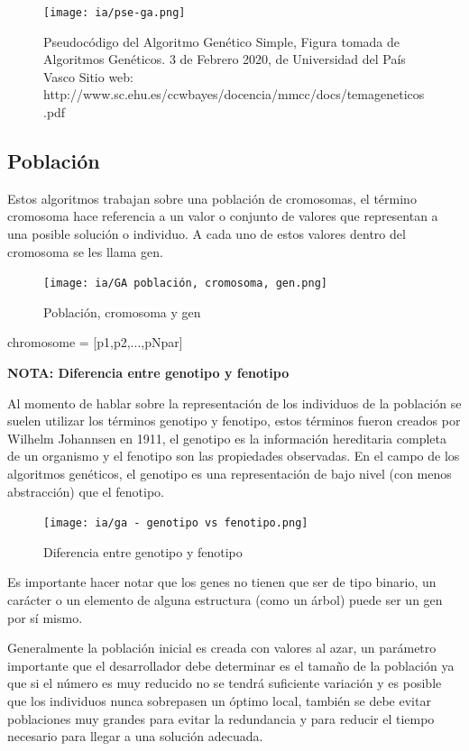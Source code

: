 \documentclass[11pt,fleqn]{book} %
\begin{document}
\begin{figure}[ht]
\centering\texttt{[image: ia/pse-ga.png]}
\caption{Pseudocódigo del Algoritmo Genético Simple, Figura tomada de Algoritmos Genéticos. 3 de Febrero 2020, de Universidad del País Vasco Sitio web: http://www.sc.ehu.es/ccwbayes/docencia/mmcc/docs/temageneticos.pdf}
\label{fig:pse-ga} 
\end{figure}

\subsection{Población}

Estos algoritmos trabajan sobre una población de cromosomas, el término cromosoma hace referencia a un valor o conjunto de valores que representan a una posible solución o individuo. A cada uno de estos valores dentro del cromosoma se les llama gen.

\begin{figure}[ht]
\centering\texttt{[image: ia/GA población, cromosoma, gen.png]}
\caption{Población, cromosoma y gen}
\label{fig:pob-crom-gen} 
\end{figure}

chromosome = [p1,p2,...,pNpar]

\textbf{NOTA: Diferencia entre genotipo y fenotipo}

Al momento de hablar sobre la representación de los individuos de la población se suelen utilizar los términos genotipo y fenotipo, estos términos fueron creados por Wilhelm Johannsen en 1911, el genotipo es la información hereditaria completa de un organismo y el fenotipo son las propiedades observadas. En el campo de los algoritmos genéticos, el genotipo es una representación de bajo nivel (con menos abstracción) que el fenotipo.

\begin{figure}[ht]
\centering\texttt{[image: ia/ga - genotipo vs fenotipo.png]}
\caption{Diferencia entre genotipo y fenotipo}
\label{fig:dif-gen-fen} 
\end{figure}

Es importante hacer notar que los genes no tienen que ser de tipo binario, un carácter o un elemento de alguna estructura (como un árbol) puede ser un gen por sí mismo.

Generalmente la población inicial es creada con valores al azar, un parámetro importante que el desarrollador debe determinar es el tamaño de la población ya que si el número es muy reducido no se tendrá suficiente variación y es posible que los individuos nunca sobrepasen un óptimo local, también se debe evitar poblaciones muy grandes para evitar la redundancia y para reducir el tiempo necesario para llegar a una solución adecuada.
\end{document}
